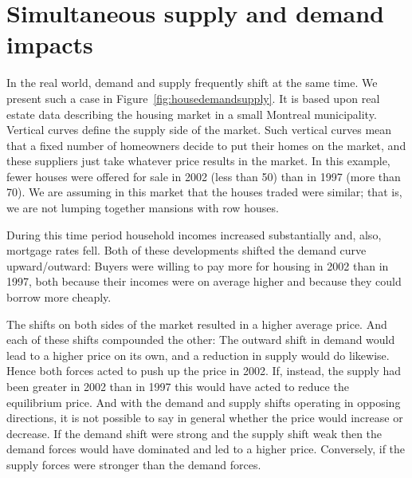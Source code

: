 \section{Simultaneous supply and demand impacts}\label{sec:ch3sec6}

In the real world, demand and supply frequently shift at the same time. We
present such a case in Figure~\ref{fig:housedemandsupply}. It is based upon
real estate data describing the housing market in a small Montreal
municipality. Vertical curves define the supply side of the market. Such
vertical curves mean that a fixed number of homeowners decide to put their
homes on the market, and these suppliers just take whatever price results in
the market. In this example, fewer houses were offered for sale in 2002
(less than 50) than in 1997 (more than 70). We are assuming in this market
that the houses traded were similar; that is, we are not lumping together
mansions with row houses.

During this time period household incomes increased substantially and, also,
mortgage rates fell. Both of these developments shifted the demand curve
upward/outward: Buyers were willing to pay more for housing in 2002 than in
1997, both because their incomes were on average higher and because they
could borrow more cheaply.

The shifts on both sides of the market resulted in a higher average price.
And each of these shifts compounded the other: The outward shift in demand
would lead to a higher price on its own, and a reduction in supply would do
likewise. Hence both forces acted to push up the price in 2002. If, instead,
the supply had been greater in 2002 than in 1997 this would have acted to
reduce the equilibrium price. And with the demand and supply shifts
operating in opposing directions, it is not possible to say in general
whether the price would increase or decrease. If the demand shift were
strong and the supply shift weak then the demand forces would have dominated
and led to a higher price. Conversely, if the supply forces were stronger
than the demand forces.



